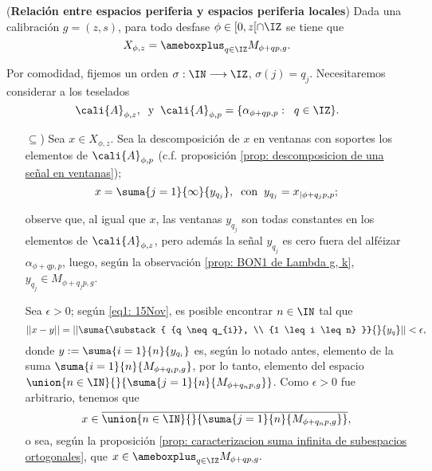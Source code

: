 \begin{prop}
(\textbf{Relación entre espacios periferia y espacios periferia locales})
Dada una calibración $g=(z,s)$, para todo 
desfase $\phi \in [0, z[ \cap \IZ$ se tiene que  
\[
X_{\phi, z}= \ameboxplus_{q \in \IZ} M_{\phi +qp,g}.
\]
\end{prop}
\begin{dem}
Por comodidad, fijemos un orden $\sigma : \IN \longrightarrow \IZ$,
$\sigma(j)=q_{j}$.
Necesitaremos considerar a los teselados
\[
\cali{A}_{\phi, z},
\hspace{0.2cm} \text{y} \hspace{0.2cm}
\cali{A}_{\phi, p}=\{ \alpha_{\phi+qp, p} : \hspace{0.2cm} q \in \IZ\}.
\]


\begin{itemize}
\item[$\subseteq$)]
Sea $x \in X_{\phi,z}$. 
Sea la descomposición de $x$ en ventanas con soportes
los elementos de $\cali{A}_{\phi,p}$ (c.f.
proposición \ref{prop: descomposicion de una señal en ventanas});
\begin{equation}
\label{eq1: 15Nov}
x=\suma{j =1}{\infty}{y_{q_{j}}}, \hspace{0.2cm}
\text{con} \hspace{0.2cm} y_{q_{j}}=x_{|\phi + q_{j}p, p};
\end{equation}


observe que, al igual que $x$, las ventanas
$y_{q_{j}}$ son todas constantes en los elementos
de $\cali{A}_{\phi, z}$, pero además
la señal
$y_{q_{j}}$ es cero fuera del
alféizar $\alpha_{\phi+qp, p}$, luego,
según la observación \ref{prop: BON1 de Lambda g, k},
$y_{q_{j}} \in M_{\phi+q_{j}p, g}$.

Sea $\epsilon >0$; según
\eqref{eq1: 15Nov}, es posible encontrar $n \in \IN$
tal que
\[
|| x - y || =
||\suma{\substack{ {q \neq q_{i}}, \\  {1 \leq i \leq n} }}{}{y_{q}}||< 
\epsilon,
\]
donde 
$y:= \suma{i=1}{n}{y_{q_{i}}}$
es, según lo notado antes, elemento de la suma
$\suma{i=1}{n}{M_{\phi+q_{i}p, g}}$, por lo tanto, elemento 
del espacio $\union{n \in \IN}{}{\suma{j=1}{n}{M_{\phi+q_{n}p, g}}}$.
Como $\epsilon >0$ fue arbitrario, tenemos que
\[
x \in \overline{\union{n \in \IN}{}{\suma{j=1}{n}{M_{\phi+q_{n}p, g}}}},
\]
o sea,  
según la proposición
\ref{prop: caracterizacion suma infinita de subespacios ortogonales},
que 
$x \in \ameboxplus_{q \in \IZ} M_{\phi +qp,g}.$


\end{itemize}
\end{dem}
